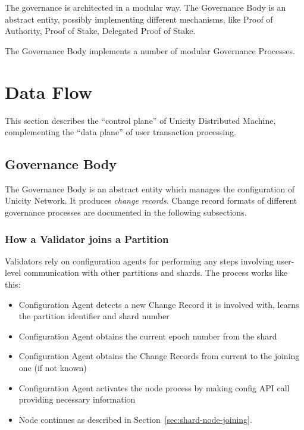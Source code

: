 The governance is architected in a modular way. The Governance Body is an abstract entity, possibly implementing different mechanisms, like Proof of Authority, Proof of Stake, Delegated Proof of Stake.

The Governance Body implements a number of modular Governance Processes.



\chapter{Data Flow}

This section describes the ``control plane'' of Unicity Distributed Machine, complementing the ``data plane'' of user transaction processing.


\section{Governance Body}

The Governance Body is an abstract entity which manages the configuration of Unicity Network. It produces \emph{change records}. Change record formats of different governance processes are documented in the following subsections.


\subsection{How a Validator joins a Partition}

Validators rely on configuration agents for performing any steps involving user-level communication with other partitions and shards. The process works like this:

\begin{itemize}
	\item Configuration Agent detects a new Change Record it is involved with, learns the partition identifier and shard number
	\item Configuration Agent obtains the current epoch number from the shard
	\item Configuration Agent obtains the Change Records from current to the joining one (if not known)
	\item Configuration Agent activates the node process by making config API call providing necessary information
	\item Node continues as described in Section~\ref{sec:shard-node-joining}.
\end{itemize}


